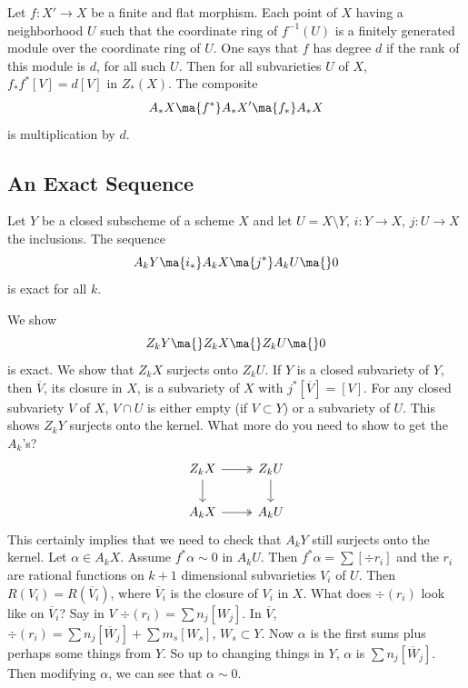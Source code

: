 \begin{ex}
Let $f: X' \to X$ be a finite and flat morphism. Each point of $X$ having a neighborhood $U$ such that the coordinate ring of $f^{-1}(U)$ is a finitely generated module over the coordinate ring of $U$. One says that $f$ has degree $d$ if the rank of this module is $d$, for all such $U$. Then for all subvarieties $U$ of $X$, $f_*f^*[V]=d[V]$ in $Z_*(X)$. The composite
	\[
	A_*X \ma{f^*} A_*X' \ma{f_*} A_*X
	\]
is multiplication by $d$. 
\end{ex}





\subsection{An Exact Sequence}

\begin{prop}
Let $Y$ be a closed subscheme of a scheme $X$ and let $U= X \setminus Y$, $i: Y \to X$, $j: U \to X$ the inclusions. The sequence
	\[
	A_kY \ma{i_*} A_kX \ma{j^*} A_k U \ma{} 0
	\]
is exact for all $k$. 
\end{prop}

\pf We show
	\[
	Z_k Y \ma{} Z_k X \ma{} Z_k U \ma{} 0
	\]
is exact. We show that $Z_k X$ surjects onto $Z_kU$. If $Y$ is a closed subvariety of $Y$, then $\overline{V}$, its closure in $X$, is a subvariety of $X$ with $j^*[\overline{V}]=[V]$. For any closed subvariety $V$ of $X$, $V \cap U$ is either empty (if $V \subset Y$) or a subvariety of $U$. This shows $Z_kY$ surjects onto the kernel. What more do you need to show to get the $A_k$'s? 
	\[
	\begin{tikzcd}
	Z_k X \arrow[two heads]{r} \arrow{d} & Z_k U \arrow{d} \\
	A_k X \arrow[two heads]{r} & A_k U
	\end{tikzcd}
	\]
This certainly implies that we need to check that $A_kY$ still surjects onto the kernel. Let $\alpha \in A_k X$. Assume $f^*\alpha \sim 0$ in $A_kU$. Then $f^*\alpha= \sum [\div r_i]$ and the $r_i$ are rational functions on $k+1$ dimensional subvarieties $V_i$ of $U$. Then $R(V_i)=R(\overline{V}_i)$, where $\overline{V}_i$ is the closure of $V_i$ in $X$. What does $\div(r_i)$ look like on $\overline{V}_i$? Say in $V$ $\div(r_i)= \sum n_j [W_j]$. In $\overline{V}$, $\div(r_i)=\sum n_j [\overline{W}_j] + \sum m_s [W_s]$, $W_s \subset Y$. Now $\alpha$ is the first sums plus perhaps some things from $Y$. So up to changing things in $Y$, $\alpha$ is $\sum n_j [\overline{W}_j]$. Then modifying $\alpha$, we can see that $\alpha \sim 0$. 





